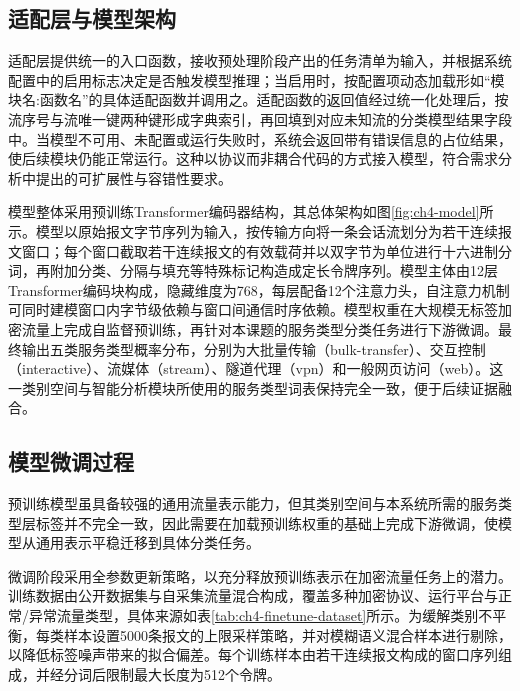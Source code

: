\subsection{适配层与模型架构}

适配层提供统一的入口函数，接收预处理阶段产出的任务清单为输入，并根据系统配置中的启用标志决定是否触发模型推理；当启用时，按配置项动态加载形如“模块名:函数名”的具体适配函数并调用之。适配函数的返回值经过统一化处理后，按流序号与流唯一键两种键形成字典索引，再回填到对应未知流的分类模型结果字段中。当模型不可用、未配置或运行失败时，系统会返回带有错误信息的占位结果，使后续模块仍能正常运行。这种以协议而非耦合代码的方式接入模型，符合需求分析中提出的可扩展性与容错性要求。

模型整体采用预训练Transformer编码器结构，其总体架构如图\ref{fig:ch4-model}所示。模型以原始报文字节序列为输入，按传输方向将一条会话流划分为若干连续报文窗口；每个窗口截取若干连续报文的有效载荷并以双字节为单位进行十六进制分词，再附加分类、分隔与填充等特殊标记构造成定长令牌序列。模型主体由12层Transformer编码块构成，隐藏维度为768，每层配备12个注意力头，自注意力机制可同时建模窗口内字节级依赖与窗口间通信时序依赖。模型权重在大规模无标签加密流量上完成自监督预训练，再针对本课题的服务类型分类任务进行下游微调。最终输出五类服务类型概率分布，分别为大批量传输（bulk-transfer）、交互控制（interactive）、流媒体（stream）、隧道代理（vpn）和一般网页访问（web）。这一类别空间与智能分析模块所使用的服务类型词表保持完全一致，便于后续证据融合。

\begin{figure}[h]
	\centering
\end{figure}

\subsection{模型微调过程}

预训练模型虽具备较强的通用流量表示能力，但其类别空间与本系统所需的服务类型层标签并不完全一致，因此需要在加载预训练权重的基础上完成下游微调，使模型从通用表示平稳迁移到具体分类任务。

微调阶段采用全参数更新策略，以充分释放预训练表示在加密流量任务上的潜力。训练数据由公开数据集与自采集流量混合构成，覆盖多种加密协议、运行平台与正常/异常流量类型，具体来源如表\ref{tab:ch4-finetune-dataset}所示。为缓解类别不平衡，每类样本设置5000条报文的上限采样策略，并对模糊语义混合样本进行剔除，以降低标签噪声带来的拟合偏差。每个训练样本由若干连续报文构成的窗口序列组成，并经分词后限制最大长度为512个令牌。

